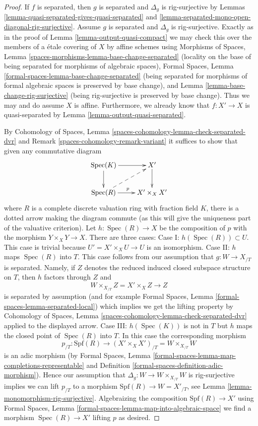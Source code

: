 \documentclass[10pt,a4paper]{amsart}
\theoremstyle{plain}
\theoremstyle{definition}
\theoremstyle{remark}
\numberwithin{equation}{subsection}
\def\Spec{\mathop{\mathrm{Spec}}}
\begin{document}
\begin{proof}
If $f$ is separated, then $g$ is separated and $\Delta_g$
is rig-surjective by
Lemmas \ref{lemma-quasi-separated-gives-quasi-separated} and
\ref{lemma-separated-mono-open-diagonal-rig-surjective}.
Assume $g$ is separated and $\Delta_g$ is rig-surjective.
Exactly as in the proof of
Lemma \ref{lemma-output-quasi-compact}
we may check this over the members of a \'etale covering of $X$
by affine schemes using
Morphisms of Spaces, Lemma \ref{spaces-morphisms-lemma-base-change-separated}
(locality on the base of being separated for morphisms of algebraic spaces),
Formal Spaces, Lemma \ref{formal-spaces-lemma-base-change-separated}
(being separated for morphisms of formal algebraic spaces is preserved
by base change), and
Lemma \ref{lemma-base-change-rig-surjective} (being rig-surjective
is preserved by base change).
Thus we may and do assume $X$ is affine. Furthermore,
we already know that $f : X' \to X$ is quasi-separated by
Lemma \ref{lemma-output-quasi-separated}.

\medskip\noindent
By Cohomology of Spaces, Lemma
\ref{spaces-cohomology-lemma-check-separated-dvr} and
Remark \ref{spaces-cohomology-remark-variant}
it suffices to show that given any commutative diagram
$$
\xymatrix{
\Spec(K) \ar[r] \ar[d] & X' \ar[d] \\
\Spec(R) \ar[r]^p \ar@{-->}[ru] & X' \times_X X'
}
$$
where $R$ is a complete discrete valuation ring with fraction field $K$,
there is a dotted arrow making the diagram commute (as this will
give the uniqueness part of the valuative criterion). Let
$h : \Spec(R) \to X$ be the composition of $p$ with the morphism
$Y \times_X Y \to X$. There are three cases:
Case I: $h(\Spec(R)) \subset U$. This case is trivial
because $U' = X' \times_X U \to U$ is an isomorphism.
Case II: $h$ maps $\Spec(R)$ into $T$. This case follows
from our assumption that $g : W \to X_{/T}$ is separated. Namely,
if $Z$ denotes the reduced induced closed subspace structure
on $T$, then $h$ factors through $Z$ and
$$
W \times_{X_{/T}} Z = X' \times_X Z \longrightarrow Z
$$
is separated by assumption (and for example
Formal Spaces, Lemma \ref{formal-spaces-lemma-separated-local})
which implies we get the lifting property by
Cohomology of Spaces, Lemma \ref{spaces-cohomology-lemma-check-separated-dvr}
applied to the displayed arrow. Case III: $h(\Spec(K))$ is not in $T$
but $h$ maps the closed point of $\Spec(R)$ into $T$. In this case
the corresponding morphism
$$
p_{/T} :
\text{Spf}(R)
\longrightarrow
(X' \times_X X')_{/T} =
W \times_{X_{/T}} W
$$
is an adic morphism (by
Formal Spaces, Lemma
\ref{formal-spaces-lemma-map-completions-representable} and
Definition \ref{formal-spaces-definition-adic-morphism}).
Hence our assumption that
$\Delta_g : W \to W \times_{X_{/T}} W$ is rig-surjective implies we can lift
$p_{/T}$ to a morphism $\text{Spf}(R) \to W = X'_{/T}$, see
Lemma \ref{lemma-monomorphism-rig-surjective}.
Algebraizing the composition $\text{Spf}(R) \to X'$ using
Formal Spaces, Lemma \ref{formal-spaces-lemma-map-into-algebraic-space}
we find a morphism $\Spec(R) \to X'$ lifting $p$ as desired.
\end{proof}
\end{document}
